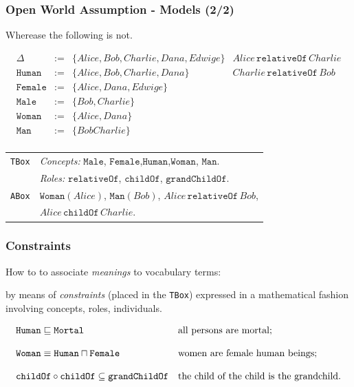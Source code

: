 \documentclass[8pt]{beamer}
\newcommand{\TBox}{{\tt TBox}}
\newcommand{\ABox}{{\tt ABox}}
\newcommand{\Mortal}{\mathtt{Mortal}}
\newcommand{\Human}{\mathtt{Human}}
\newcommand{\Male}{\mathtt{Male}}
\newcommand{\Female}{\mathtt{Female}}
\newcommand{\Man}{\mathtt{Man}}
\newcommand{\Woman}{\mathtt{Woman}}
\newcommand{\relative}{\mathtt{relativeOf}}
\newcommand{\child}{\mathtt{childOf}}
\newcommand{\grandchild}{\mathtt{grandChildOf}}
\newcommand{\Alice}{Alice}
\newcommand{\Bob}{Bob}
\newcommand{\Charlie}{Charlie}
\newcommand{\Dana}{Dana}
\newcommand{\Edwige}{Edwige}
\begin{document}
\begin{frame}
\frametitle{Open World Assumption - Models (2/2)}
Wherease the following is not.
\vspace{\baselineskip}

\[
 \begin{array}{rcl|l}
 \Delta & := & \{ \Alice, \Bob, \Charlie, \Dana, \Edwige\} & \Alice\,\relative\,\Charlie\\
 \Human & := & \{ \Alice, \Bob, \Charlie, \Dana \} & \Charlie\,\relative\,\Bob\\
 \Female & := & \{ \Alice, \Dana, \Edwige \} \\
 \Male & := & \{\Bob, \Charlie \}\\
 \Woman & := & \{ \Alice, \Dana \} \\
 \Man & := & \{\Bob \Charlie \} \\
 \end{array}
\]

\phantom{is a model for}

\begin{center}
  \begin{tabular}{|l|l|}
    \hline
    \TBox & \emph{Concepts:} $\Male$, $\Female$,$\Human$,$\Woman$, $\Man$. \\ 
    & \emph{Roles:} $\relative$, $\child$, $\grandchild$. \\      
    \hline
    \ABox & $\Woman(\Alice)$, $\Man(\Bob)$, $\Alice\,\relative\,\Bob$, \\
     & 	\alert{$\Alice\,\child\,\Charlie$}. \\
    \hline
  \end{tabular}
\end{center}
\end{frame}



\begin{frame}
\frametitle{Constraints}

How to to associate \emph{meanings} to vocabulary 
terms:
\vspace{\baselineskip}

by means of \emph{constraints} (placed in the \TBox) expressed in a mathematical
fashion involving concepts, roles, individuals. 

\begin{example}
\[
\begin{array}{ll}
\Human \Issub \Mortal & \mbox{all persons are mortal;} \\
\\
\Woman \equiv \Human \sqcap \Female & \mbox{women are female human beings;} \\
\\
\child \circ \child \subseteq \grandchild & \mbox{the child of the child is the grandchild.} 
\end{array}
\] 
\end{example}
\vspace{\baselineskip}

\end{frame}
\end{document}
